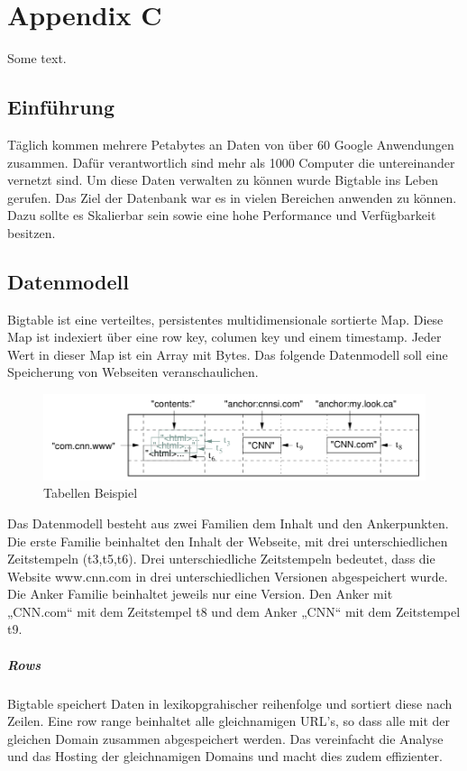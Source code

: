 \chapter{Appendix C}
\label{appendiceC}
Some text.

\section{Einführung}
Täglich kommen mehrere Petabytes an Daten von über 60 Google Anwendungen zusammen. Dafür verantwortlich sind mehr als 1000 Computer die untereinander vernetzt sind. Um diese Daten verwalten zu können wurde Bigtable ins Leben gerufen. Das Ziel der Datenbank war es in vielen Bereichen anwenden zu können. Dazu sollte es Skalierbar sein sowie eine hohe Performance und Verfügbarkeit besitzen.


\section{Datenmodell}
Bigtable ist eine verteiltes, persistentes multidimensionale sortierte Map. Diese Map ist indexiert über eine row key, columen key und einem timestamp. Jeder Wert in dieser Map ist ein Array mit Bytes. Das folgende Datenmodell soll eine Speicherung von Webseiten veranschaulichen.

\begin{figure}[!htpb]
	\centering
	\includegraphics[]{pics/bigtable_schema.png}
	\caption {Tabellen Beispiel}	
\end{figure}

Das Datenmodell besteht aus zwei Familien dem Inhalt und den Ankerpunkten. Die erste Familie beinhaltet den Inhalt der Webseite, mit drei unterschiedlichen Zeitstempeln (t3,t5,t6). Drei unterschiedliche Zeitstempeln bedeutet, dass die Website www.cnn.com in drei unterschiedlichen Versionen abgespeichert wurde. Die Anker Familie beinhaltet jeweils nur eine Version. Den Anker mit „CNN.com“ mit dem Zeitstempel t8 und dem Anker „CNN“ mit dem Zeitstempel t9. 
 
\paragraph{Rows}
Bigtable speichert Daten in lexikopgrahischer reihenfolge und sortiert diese nach Zeilen. Eine row range beinhaltet alle gleichnamigen URL’s, so dass alle mit der gleichen Domain zusammen abgespeichert werden. Das vereinfacht die Analyse und das Hosting der gleichnamigen Domains und macht dies zudem effizienter.

